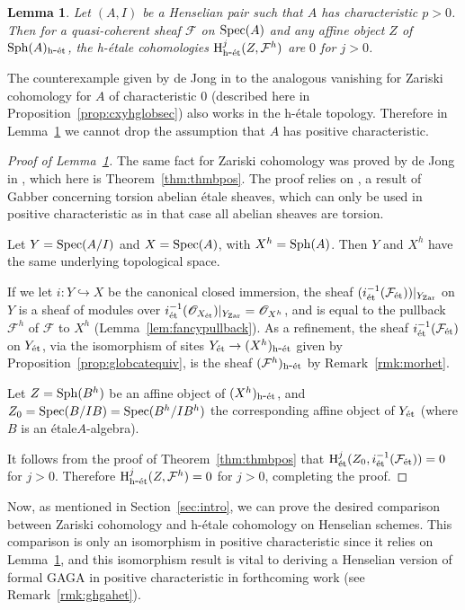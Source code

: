 \documentclass[12pt]{article}
\renewcommand{\O}{\mathscr{O}}
\newcommand{\F}{\mathcal{F}}
\newcommand{\spec}{{\rm Spec}}
\newcommand{\sph}{{\rm Sph}}
\newcommand{\Et}{\'etale\xspace}
\newcommand{\hetale}{h-\'etale\xspace}
\newcommand{\et}{{\rm\acute{e}t}}
\newcommand{\het}{{\rm h\mbox{-}\et}}
\newcommand{\zar}{{\rm Zar}}
\renewcommand{\H}{{\rm H}}
\newcommand{\spcite}[2]{\cite[\href{https://stacks.math.columbia.edu/tag/#1}{{#2} {#1}}]{stackp}}
\newtheorem{lemma}[theorem]{Lemma}
\theoremstyle{definition}
\numberwithin{equation}{subsection}
\begin{document}
\begin{lemma}\label{lem:thmbhet} Let $(A,I)$ be a Henselian pair such that $A$ has characteristic $p > 0$. Then for a quasi-coherent sheaf $\F$ on $\spec(A)$ and any affine object $Z$ of $\sph(A)_{\het}$, the \hetale cohomologies $\H^j_{\het}(Z,\F^h)$ are $0$ for $j > 0$.
\end{lemma}

The counterexample given by de Jong in \cite{nothmbblog} to the analogous vanishing for Zariski cohomology for $A$ of characteristic $0$ (described here in Proposition~\ref{prop:cxyhglobsec}) also works in the \hetale topology. Therefore in Lemma~\ref{lem:thmbhet} we cannot drop the assumption that $A$ has positive characteristic. 

\begin{proof}[Proof of Lemma~\ref{lem:thmbhet}] The same fact for Zariski cohomology was proved by de Jong in \cite{thmbblog}, which here is Theorem~\ref{thm:thmbpos}. The proof relies on \spcite{09ZI}{Theorem}, a result of Gabber concerning torsion abelian \Et sheaves, which can only be used in positive characteristic as in that case all abelian sheaves are torsion.

Let $Y=\spec(A/I)$ and $X=\spec(A)$, with $X^h=\sph(A)$. Then $Y$ and $X^h$ have the same underlying topological space.

 If we let $i: Y \hookrightarrow X$ be the canonical closed immersion, the sheaf $(i_{\et}^{-1}(\F_{\et}))|_{Y_{\zar}}$ on $Y$ is a sheaf of modules over $i_{\et}^{-1}(\O_{X_{\et}})|_{Y_{\zar}} = \O_{X^h}$, and is equal to the pullback $\F^h$ of $\F$ to $X^h$ (Lemma~\ref{lem:fancypullback}). As a refinement, the sheaf $i_{\et}^{-1}(\F_{\et})$ on $Y_{\et}$, via the isomorphism of sites $Y_{\et} \to (X^h)_{\het}$ given by Proposition~\ref{prop:globcatequiv}, is the sheaf $(\F^h)_{\het}$ by Remark~\ref{rmk:morhet}.

Let $Z=\sph(B^h)$ be an affine object of $(X^h)_{\het}$, and $Z_0=\spec(B/IB)=\spec(B^h/IB^h)$ the corresponding affine object of $Y_{\et}$ (where $B$ is an \Et $A$-algebra). 

It follows from the proof of Theorem~\ref{thm:thmbpos} that $\H^j_{\et}(Z_0,i_{\et}^{-1}(\F_{\et}))=0$ for $j>0$. Therefore $\H^j_{\het}(Z,\F^h)=0$ for $j >0$, completing the proof.\end{proof}
 
 
Now, as mentioned in Section~\ref{sec:intro}, we can prove the desired comparison between Zariski cohomology and \hetale cohomology on Henselian schemes. This comparison is only an isomorphism in positive characteristic since it relies on Lemma~\ref{lem:thmbhet},  and this isomorphism result is vital to deriving a Henselian version of formal GAGA in positive characteristic in forthcoming work \cite{ghga} (see Remark~\ref{rmk:ghgahet}).
\end{document}
